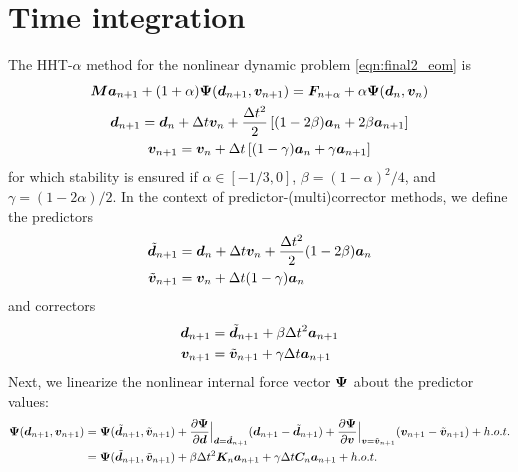 \section{Time integration}
The HHT-$\alpha$ method for the nonlinear dynamic problem \cref{eqn:final2_eom} is 
\begin{gather}
    \label{eqn:final2_hht} \bm{M} \bm{a}_{n+1} + (1+\alpha) \bm{\Psi}(\bm{d}_{n+1}, \bm{v}_{n+1}) = \bm{F}_{n+\alpha} + \alpha \bm{\Psi}(\bm{d}_n, \bm{v}_n) \\
    \bm{d}_{n+1} = \bm{d}_n + \Delta t \bm{v}_n + \frac{\Delta t^2}{2} \left[ (1-2\beta) \bm{a}_n + 2\beta \bm{a}_{n+1} \right] \\
    \bm{v}_{n+1} = \bm{v}_n + \Delta t \left[ (1-\gamma) \bm{a}_n + \gamma \bm{a}_{n+1} \right]
\end{gather}
for which stability is ensured if $\alpha \in [-1/3, 0]$, $\beta={(1-\alpha)}^2/4$, and $\gamma = (1-2\alpha) / 2$.
In the context of predictor-(multi)corrector methods, we define the predictors 
\begin{equation}
\begin{aligned}
    \tilde{\bm{d}}_{n+1} &= \bm{d}_n + \Delta t \bm{v}_n + \frac{\Delta t^2}{2} (1 - 2\beta) \bm{a}_n \\
    \tilde{\bm{v}}_{n+1} &= \bm{v}_n + \Delta t (1 - \gamma) \bm{a}_n
\end{aligned}
\end{equation}
and correctors 
\begin{equation}
\begin{aligned}
    \bm{d}_{n+1} &= \tilde{\bm{d}}_{n+1} + \beta \Delta t^2 \bm{a}_{n+1}\\ 
    \bm{v}_{n+1} &= \tilde{\bm{v}}_{n+1} + \gamma \Delta t \bm{a}_{n+1}
\end{aligned}
\end{equation}
Next, we linearize the nonlinear internal force vector $\bm{\Psi}$ about the predictor values:
\begin{equation}
\begin{aligned}
    \bm{\Psi}(\bm{d}_{n+1}, \bm{v}_{n+1}) &= \bm{\Psi}(\tilde{\bm{d}}_{n+1}, \tilde{\bm{v}}_{n+1}) + \frac{\partial \bm{\Psi}}{\partial \bm{d}} \Big|_{\bm{d}=\tilde{\bm{d}}_{n+1}} (\bm{d}_{n+1} - \tilde{\bm{d}}_{n+1}) + \frac{\partial \bm{\Psi}}{\partial \bm{v}} \Big|_{\bm{v}=\tilde{\bm{v}}_{n+1}} (\bm{v}_{n+1} - \tilde{\bm{v}}_{n+1}) + h.o.t. \\
    &= \bm{\Psi}(\tilde{\bm{d}}_{n+1}, \tilde{\bm{v}}_{n+1}) + \beta \Delta t^2 \bm{K}_n \bm{a}_{n+1} + \gamma \Delta t \bm{C}_n \bm{a}_{n+1} + h.o.t. \\
\end{aligned}
\end{equation}
